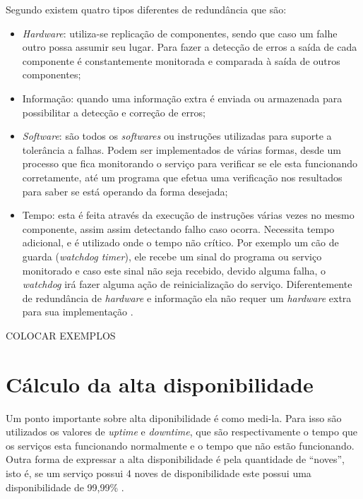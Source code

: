 Segundo \cite{norvag2000} existem quatro tipos diferentes de redundância que são:
\begin{itemize}
 \item \textit{Hardware}: utiliza-se replicação de componentes, sendo que caso um falhe outro possa assumir seu lugar. 
 Para fazer a detecção de erros a saída de cada componente é constantemente monitorada e comparada à saída de outros componentes;
 \item Informação: quando uma informação extra é enviada ou armazenada para possibilitar a detecção e correção de erros;
 \item \textit{Software}: são todos os \textit{softwares} ou instruções utilizadas para suporte a tolerância a falhas. Podem ser implementados
 de várias formas, desde um processo que fica monitorando o serviço para verificar se ele esta funcionando corretamente, até um programa
 que efetua uma verificação nos resultados para saber se está operando da forma desejada;
 \item Tempo: esta é feita através da execução de instruções várias vezes no mesmo componente, assim assim detectando falho caso ocorra.
 Necessita tempo adicional, e é utilizado onde o tempo não crítico. Por exemplo um cão de guarda (\textit{watchdog timer}), ele
 recebe um sinal do programa ou serviço monitorado e caso este sinal não seja recebido, devido alguma falha, o \textit{watchdog} irá fazer 
 alguma ação de reinicialização do serviço.
 Diferentemente de redundância de \textit{hardware} e informação ela não requer um \textit{hardware} extra para sua implementação \cite{costa2009}.
\end{itemize} COLOCAR EXEMPLOS

\section{Cálculo da alta disponibilidade}

Um ponto importante sobre alta diponibilidade é como medi-la. Para isso são utilizados os valores de \textit{uptime} e 
\textit{downtime}, que são respectivamente o tempo que os serviços esta funcionando normalmente e o tempo que não estão funcionando.
Outra forma de expressar a alta disponibilidade é pela quantidade de ``noves'', isto é, se um serviço possui 4 noves de disponibilidade
este possui uma disponibilidade de 99,99\% \cite{pereirafilho2004}.

